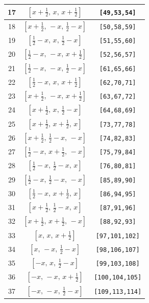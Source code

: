 \documentclass[fleqn,8pt]{jsarticle}
\begin{document}
\begin{longtable}{ccc}
17 & $\left[ x + \frac{1}{2},\, x,\, x + \frac{1}{2} \right]$ & {\tt [49,53,54]} \\ \hline
18 & $\left[ x + \frac{1}{2},\, - x,\, \frac{1}{2} - x \right]$ & {\tt [50,58,59]} \\ \hline
19 & $\left[ \frac{1}{2} - x,\, x,\, \frac{1}{2} - x \right]$ & {\tt [51,55,60]} \\ \hline
20 & $\left[ \frac{1}{2} - x,\, - x,\, x + \frac{1}{2} \right]$ & {\tt [52,56,57]} \\ \hline
21 & $\left[ \frac{1}{2} - x,\, - x,\, \frac{1}{2} - x \right]$ & {\tt [61,65,66]} \\ \hline
22 & $\left[ \frac{1}{2} - x,\, x,\, x + \frac{1}{2} \right]$ & {\tt [62,70,71]} \\ \hline
23 & $\left[ x + \frac{1}{2},\, - x,\, x + \frac{1}{2} \right]$ & {\tt [63,67,72]} \\ \hline
24 & $\left[ x + \frac{1}{2},\, x,\, \frac{1}{2} - x \right]$ & {\tt [64,68,69]} \\ \hline
25 & $\left[ x + \frac{1}{2},\, x + \frac{1}{2},\, x \right]$ & {\tt [73,77,78]} \\ \hline
26 & $\left[ x + \frac{1}{2},\, \frac{1}{2} - x,\, - x \right]$ & {\tt [74,82,83]} \\ \hline
27 & $\left[ \frac{1}{2} - x,\, x + \frac{1}{2},\, - x \right]$ & {\tt [75,79,84]} \\ \hline
28 & $\left[ \frac{1}{2} - x,\, \frac{1}{2} - x,\, x \right]$ & {\tt [76,80,81]} \\ \hline
29 & $\left[ \frac{1}{2} - x,\, \frac{1}{2} - x,\, - x \right]$ & {\tt [85,89,90]} \\ \hline
30 & $\left[ \frac{1}{2} - x,\, x + \frac{1}{2},\, x \right]$ & {\tt [86,94,95]} \\ \hline
31 & $\left[ x + \frac{1}{2},\, \frac{1}{2} - x,\, x \right]$ & {\tt [87,91,96]} \\ \hline
32 & $\left[ x + \frac{1}{2},\, x + \frac{1}{2},\, - x \right]$ & {\tt [88,92,93]} \\ \hline
33 & $\left[ x,\, x,\, x + \frac{1}{2} \right]$ & {\tt [97,101,102]} \\ \hline
34 & $\left[ x,\, - x,\, \frac{1}{2} - x \right]$ & {\tt [98,106,107]} \\ \hline
35 & $\left[ - x,\, x,\, \frac{1}{2} - x \right]$ & {\tt [99,103,108]} \\ \hline
36 & $\left[ - x,\, - x,\, x + \frac{1}{2} \right]$ & {\tt [100,104,105]} \\ \hline
37 & $\left[ - x,\, - x,\, \frac{1}{2} - x \right]$ & {\tt [109,113,114]} \\ \hline

\end{longtable}
\end{document}
